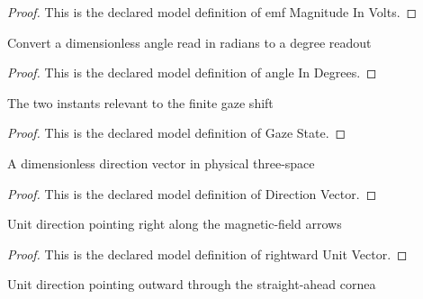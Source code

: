 \begin{proof}
  This is the declared model definition of emf Magnitude In Volts.
\end{proof}
\begin{definition}
  \label{def:physics:phyx-mini-0933:phyxminiproblems-problemphyxmini0933-angleindegrees}
  Convert a dimensionless angle read in radians to a degree readout
\end{definition}
\begin{proof}
  This is the declared model definition of angle In Degrees.
\end{proof}
\begin{definition}
  \label{def:physics:phyx-mini-0933:phyxminiproblems-problemphyxmini0933-gazestate}
  The two instants relevant to the finite gaze shift
\end{definition}
\begin{proof}
  This is the declared model definition of Gaze State.
\end{proof}
\begin{definition}
  \label{def:physics:phyx-mini-0933:phyxminiproblems-problemphyxmini0933-directionvector}
  A dimensionless direction vector in physical three-space
\end{definition}
\begin{proof}
  This is the declared model definition of Direction Vector.
\end{proof}
\begin{definition}
  \label{def:physics:phyx-mini-0933:phyxminiproblems-problemphyxmini0933-rightwardunitvector}
  Unit direction pointing right along the magnetic-field arrows
\end{definition}
\begin{proof}
  This is the declared model definition of rightward Unit Vector.
\end{proof}
\begin{definition}
  \label{def:physics:phyx-mini-0933:phyxminiproblems-problemphyxmini0933-straightaheadunitvector}
  Unit direction pointing outward through the straight-ahead cornea
\end{definition}
